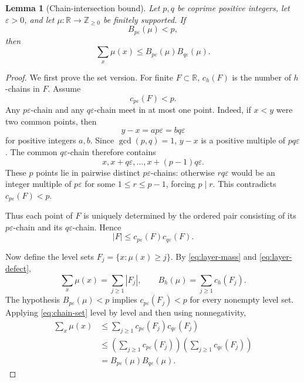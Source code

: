\documentclass[11pt]{article}
\newtheorem{lemma}[theorem]{Lemma}
\theoremstyle{definition}
\newcommand{\R}{\mathbb{R}}
\newcommand{\Z}{\mathbb{Z}}
\newcommand{\1}{\mathbf{1}}
\begin{document}
\begin{lemma}[Chain-intersection bound]\label{lem:chain-intersection}
Let $p,q$ be coprime positive integers, let $\varepsilon>0$, and let $\mu:\R\to\Z_{\ge0}$ be finitely supported.  If
\[
  B_{p\varepsilon}(\mu)<p,
\]
then
\begin{equation}\label{eq:chain-mu}
  \sum_x\mu(x)
  \le B_{p\varepsilon}(\mu)B_{q\varepsilon}(\mu).
\end{equation}
\end{lemma}

\begin{proof}
We first prove the set version.  For finite $F\subset\R$, $c_h(F)$ is the number of $h$-chains in $F$.  Assume
\[
  c_{p\varepsilon}(F)<p.
\]
Any $p\varepsilon$-chain and any $q\varepsilon$-chain meet in at most one point.  Indeed, if $x<y$ were two common points, then
\[
  y-x=ap\varepsilon=bq\varepsilon
\]
for positive integers $a,b$.  Since $\gcd(p,q)=1$, $y-x$ is a positive multiple of $pq\varepsilon$.  The common $q\varepsilon$-chain therefore contains
\[
  x,x+q\varepsilon,\ldots,x+(p-1)q\varepsilon.
\]
These $p$ points lie in pairwise distinct $p\varepsilon$-chains: otherwise $rq\varepsilon$ would be an integer multiple of $p\varepsilon$ for some $1\le r\le p-1$, forcing $p\mid r$.  This contradicts $c_{p\varepsilon}(F)<p$.

Thus each point of $F$ is uniquely determined by the ordered pair consisting of its $p\varepsilon$-chain and its $q\varepsilon$-chain.  Hence
\begin{equation}\label{eq:chain-set}
  |F|\le c_{p\varepsilon}(F)c_{q\varepsilon}(F).
\end{equation}

Now define the level sets $F_j=\{x:\mu(x)\ge j\}$.  By \eqref{eq:layer-mass} and \eqref{eq:layer-defect},
\[
  \sum_x\mu(x)=\sum_{j\ge1}|F_j|,
  \qquad
  B_h(\mu)=\sum_{j\ge1}c_h(F_j).
\]
The hypothesis $B_{p\varepsilon}(\mu)<p$ implies $c_{p\varepsilon}(F_j)<p$ for every nonempty level set.  Applying \eqref{eq:chain-set} level by level and then using nonnegativity,
\begin{align*}
  \sum_x\mu(x)
  &\le\sum_{j\ge1}c_{p\varepsilon}(F_j)c_{q\varepsilon}(F_j)\\
  &\le\left(\sum_{j\ge1}c_{p\varepsilon}(F_j)\right)
       \left(\sum_{j\ge1}c_{q\varepsilon}(F_j)\right)\\
  &=B_{p\varepsilon}(\mu)B_{q\varepsilon}(\mu).
\end{align*}
\end{proof}
\end{document}
